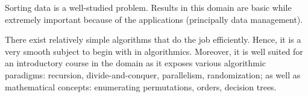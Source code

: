 \label{tree:sorting:intro}

Sorting data is a well-studied problem. Results in this domain are basic while
extremely important because of the applications (principally data management).

There exist relatively simple algorithms that do the job efficiently. Hence, it
is a very smooth subject to begin with in algorithmics. Moreover, it is well
suited for an introductory course in the domain as it exposes various
algorithmic paradigms: recursion, divide-and-conquer, parallelism,
randomization; as well as mathematical concepts: enumerating permutations,
orders, decision trees.
